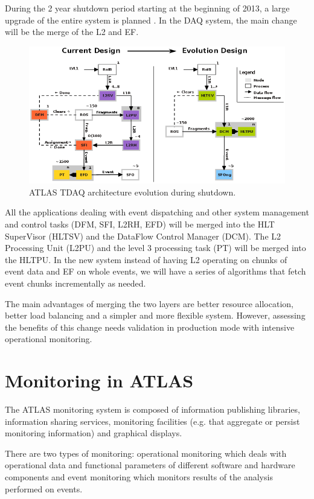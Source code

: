 During the 2 year shutdown period starting at the beginning of 2013, a large upgrade of the entire system is planned \citep{hauser2012atlas}. In the DAQ system, the main change will be the merge of the L2 and EF.  

\begin{figure}[ht!]
\centering
\includegraphics[scale=0.55]{Images/Evolution.png}
\caption{ATLAS TDAQ architecture evolution during shutdown.}
\end{figure}

All the applications dealing with event dispatching and other system management and control tasks (DFM, SFI, L2RH, EFD) will be merged into the HLT SuperVisor (HLTSV) and the DataFlow Control Manager (DCM). 
The L2 Processing Unit (L2PU) and the level 3 processing task (PT) will be merged into the HLTPU. In the new system instead of having L2 operating on chunks of event data and EF on whole events, we will have a series of algorithms that fetch event chunks incrementally as needed.

The main advantages of merging the two layers are better resource allocation, better load balancing and a simpler and more flexible system. However, assessing the benefits of this change needs validation in production mode with intensive operational monitoring.

\section{Monitoring in ATLAS}

The ATLAS monitoring system \citep{collaboration2003atlas} is composed of information publishing libraries, information sharing services, monitoring facilities (e.g. that aggregate or persist monitoring information) and graphical displays.

There are two types of monitoring: operational monitoring which deals with operational data and functional parameters of different software and hardware components and event monitoring which monitors results of the analysis performed on events.

